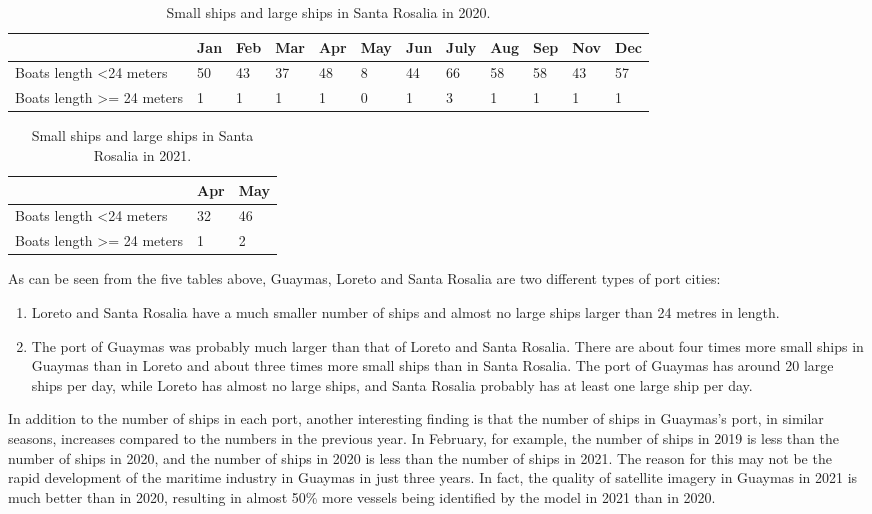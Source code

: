 \begin{table}[h!]
\begin{tabular}{|l|l|l|l|l|l|l|l|l|l|l|l|}
\hline
                                       & Jan & Feb & Mar & Apr & May & Jun & July & Aug & Sep & Nov & Dec \\ \hline
Boats length \textless 24 meters       & 50  & 43  & 37  & 48  & 8   & 44  & 66   & 58  & 58  & 43  & 57  \\ \hline
Boats length \textgreater{}= 24 meters & 1   & 1   & 1   & 1   & 0   & 1   & 3    & 1   & 1   & 1   & 1   \\ \hline
\end{tabular}
\caption{Small ships and large ships in Santa Rosalia in 2020.}
\end{table}


\begin{table}[h!]
\begin{tabular}{|l|l|l|}
\hline
                                       & Apr & May \\ \hline
Boats length \textless 24 meters       & 32  & 46  \\ \hline
Boats length \textgreater{}= 24 meters & 1   & 2   \\ \hline
\end{tabular}
\caption{Small ships and large ships in Santa Rosalia in 2021.}
\end{table}




As can be seen from the five tables above, Guaymas, Loreto and Santa Rosalia are two different types of port cities:

\begin{enumerate}
    \item Loreto and Santa Rosalia have a much smaller number of ships and almost no large ships larger than 24 metres in length.
    \item The port of Guaymas was probably much larger than that of Loreto and Santa Rosalia. There are about four times more small ships in Guaymas than in Loreto and about three times more small ships than in Santa Rosalia. The port of Guaymas has around 20 large ships per day, while Loreto has almost no large ships, and Santa Rosalia probably has at least one large ship per day.
\end{enumerate}

In addition to the number of ships in each port, another interesting finding is that the number of ships in Guaymas's port, in similar seasons, increases compared to the numbers in the previous year. In February, for example, the number of ships in 2019 is less than the number of ships in 2020, and the number of ships in 2020 is less than the number of ships in 2021. The reason for this may not be the rapid development of the maritime industry in Guaymas in just three years. In fact, the quality of satellite imagery in Guaymas in 2021 is much better than in 2020, resulting in almost 50\% more vessels being identified by the model in 2021 than in 2020. \\

